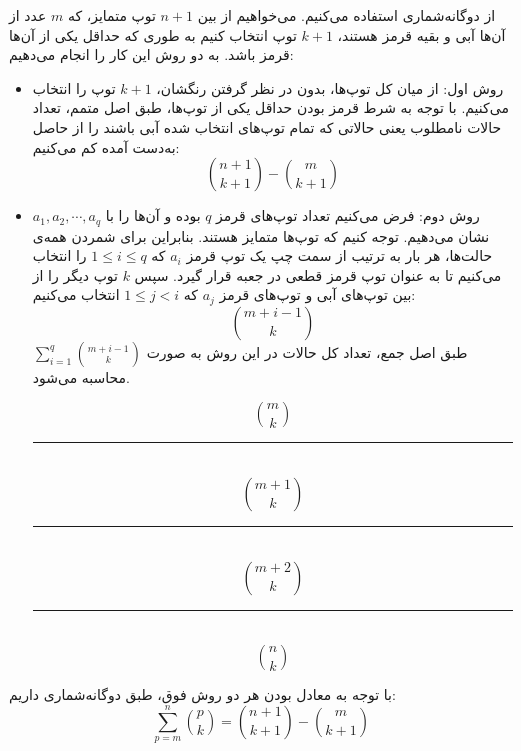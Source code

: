 \p		
از دوگانه‌شماری استفاده می‌کنیم. می‌خواهیم از بین
$n + 1$
توپ متمایز، که 
$m$
عدد از آن‌ها آبی و بقیه قرمز هستند، 
$k + 1$
توپ انتخاب کنیم به طوری که حداقل یکی از آن‌ها قرمز باشد. به دو روش این کار را انجام می‌دهیم:
\begin{itemize}
\item
روش اول: 
از میان کل توپ‌ها، بدون در نظر گرفتن رنگشان،
 $k + 1$
توپ را انتخاب می‌کنیم. با توجه به شرط قرمز بودن حداقل یکی از توپ‌ها، طبق اصل متمم، تعداد حالات نامطلوب یعنی حالاتی که تمام توپ‌های انتخاب شده آبی باشند را از حاصل به‌دست آمده کم می‌کنیم:
$$\binom{n + 1}{k + 1} - \binom{m}{k + 1}$$
\item 
روش دوم:
فرض می‌کنیم تعداد توپ‌های قرمز
$q$
بوده و آن‌ها را با
$a_1, a_2, \cdots, a_q$
نشان می‌دهیم. 
توجه کنیم که توپ‌ها متمایز هستند. بنابراین برای شمردن همه‌ی حالت‌ها، هر بار به ترتیب از سمت چپ یک توپ قرمز 
$a_i$
که
$1\leq i\leq q$
 را انتخاب می‌کنیم تا به عنوان توپ قرمز قطعی در جعبه قرار گیرد.
سپس 
 $k$
 توپ دیگر را از بین توپ‌های آبی و توپ‌های قرمز 
 $a_j$
 که
 $1\leq j<i$
  انتخاب می‌کنیم:
  $$\binom{m+i-1}{k}$$
طبق اصل جمع، تعداد کل حالات در این روش به صورت
 $\sum\limits_{i=1}^{q}\binom{m+i-1}{k}$
محاسبه می‌شود.

\p
{}
$$\binom{m}{k}$$
\hrule
\p
\\
 $$\binom{m + 1}{k}$$
 \hrule
\p
\\
  $$\binom{m + 2}{k}$$
  \hrule
 \p
 \\
 $$\binom{n}{k}$$

\end{itemize}
با ‌توجه به معادل بودن هر دو روش فوق، طبق دوگانه‌شماری داریم:
$$\sum\limits_{p=m}^{n}\binom{p}{k} = \binom{n + 1}{k + 1} - \binom{m}{k + 1}$$